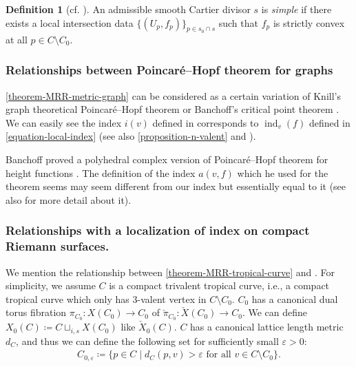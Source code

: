\documentclass[a4paper,dvipdfmx,reqno,12pt]{amsart}
\theoremstyle{definition}
\newtheorem{definition}[theorem]{Definition}
\newcommand{\deq}{\coloneqq}
\newcommand{\vep}{\varepsilon}%
\newcommand{\opn}[1]{\operatorname{#1}}
\numberwithin{equation}{section}
\begin{document}
\begin{definition}[{cf. \cite{auroux2022lagrangian}}]
An admissible smooth Cartier divisor $s$ is 
\emph{simple} if there exists a local intersection data
$\{(U_p,f_p)\}_{p\in s_0\cap s}$ such that
$f_p$ is strictly convex at all $p\in C\setminus C_0$.
\end{definition}

\subsubsection{Relationships between 
Poincar\'e--Hopf theorem for graphs}

\cref{theorem-MRR-metric-graph} can be considered 
as a certain variation of Knill's graph 
theoretical Poincar\'e--Hopf theorem \cite{knill2012graph}
or 
Banchoff's critical point theorem \cite{MR225327}.
We can easily see the index $i(v)$ defined in 
\cite[3]{knill2012graph}
corresponds to $\opn{ind}_v(f)$ defined in 
\cref{equation-local-index} (see also 
\cref{proposition-n-valent} and \cite[7]{knill2012graph}).

Banchoff proved a polyhedral complex version of Poincar\'e--Hopf theorem
for height functions \cite[Theorem 1]{MR225327}.
The definition of the index $a(v,f)$ 
\cite[p.246]{MR225327} which 
he used for the theorem seems may seem different 
from our index but essentially equal to it
(see also \cite[p.143-144]{grunert2017piecewise} 
for more detail about it).





\subsubsection{Relationships with a localization of 
index on compact Riemann surfaces.}

We mention the relationship between 
\cref{theorem-MRR-tropical-curve} and
\cite[6]{MR2676658}.
For simplicity,
we assume $C$ is a compact trivalent tropical curve, i.e.,
a compact tropical curve which only has $3$-valent
vertex in $C\setminus C_0$.  
$C_0$ has a canonical dual torus fibration 
$\pi_{C_0}\colon X(C_0)\to C_0$ of
$\check{\pi}_{C_0} \colon \check{X}(C_0)\to C_0$.
We can define $X_0(C)\deq C\sqcup_{i,s} X(C_0)$ like
$\check{X}_0(C)$.
$C$ has a canonical lattice length metric $d_{C}$, and
thus we can define the following set for sufficiently small
$\vep >0$: 
\begin{align}
C_{0,\vep}\deq \{p\in C\mid d_C(p,v)>\vep 
\text{ for all } v\in C\setminus C_0\}.
\end{align}
\end{document}
